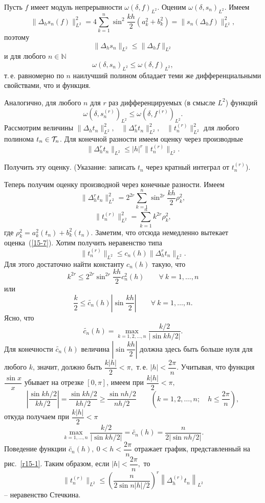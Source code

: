 Пусть $f$ имеет модуль непрерывности
{$\omega(\delta,f)_{{L^2}}.$} Оценим $\omega(\delta,s_n)_{L^2}.$
Имеем
$$
\|\Delta_h s_n{(f)}\|_{{L^2}}^2=4\sum\limits_{k=1}^n \sin^2 \frac{kh}{2}
(a_{{k}}^2+b_k^2){=\|s_n(\Delta_h f)\|_{L^2}^2},
$$
{поэтому}
$$
\|\Delta_h s_n\|_{{L^2}}\le \|\Delta_h f\|_{{L^2}}
$$
и {для любого $n\in \mathbb{N}$}
$$
\omega(\delta,s_n)_{{L^2}}\le \omega(\delta,f)_{{L^2}},
$$
т.\,е. равномерно по $n$ наилучший полином обладает теми же
дифференциальными свойствами, что и функция.

{Аналогично, для любого $n$ для $r$ раз дифференцируемых (в смысле $L^2$) функций}
$$
\omega(\delta,s_n^{(r)})_{L^2}\le \omega(\delta,f^{(r)})_{L^2}.
$$
Рассмотрим {величины} $\|\Delta_h t_n\|_{{L^2}}^2,$~ $\|\Delta_h^{r}
t_n\|_{{L^2}}^2,$~ $\|t_n^{(r)}\|_{{L^2}}^2$ {для любого
полинома $t_n\in {\cal T}_n$}. Для конечной разности имеем оценку через производные
\begin{equation}\label{15-7}
\|\Delta_h^{r} t_n\|_{{L^2}}\le |h|^r \|t_n^{(r)}\|_{{L^2}}.
\end{equation}

\begin{ex}
Получить эту оценку. (Указание: записать {$t_n$} через кратный интеграл {от $t_n^{(r)}$}).
\end{ex}

Теперь получим оценку производной через конечные
разности. Имеем
$$
\|\Delta_h^{r} t_n\|_{{L^2}}^2 = 2^{2r}\sum\limits_{k=1}^n
\sin^{2r}\frac{kh}{2}\rho_k^2,
$$
$$
\|t_n^{(r)}\|_{{L^2}}^2=\sum\limits_{k=1}^n k^{2r}\rho_k^2,
$$
{где $\rho_k^2=a_k^2(t_n)+b_k^2(t_n)$.} Заметим, что отсюда
немедленно вытекает оценка~(\ref{15-7}).
Хотим получить неравенство типа
$$
\|t_n^{(r)}\|_{L^2}\le c_n(h) \|\Delta_h^{r} t_n\|_{L^2}.
$$
Для этого достаточно найти константу $c_n(h)$ такую, что
$$
k^{2r}\le 2^{2r}\sin^{2r} \frac{kh}{2} c_n^2(h)\qquad \forall\ k=1,\ldots,n
$$
или
$$
\frac{k}{2}\le \widetilde{c_n}(h)\left| \sin\frac{kh}{2}\right|\qquad \forall\ k=1,\ldots,n.
$$
Ясно, что
$$
 \widetilde{c_n}(h)=\max_{k=1,2,\ldots,n}\frac{k/2}{|\sin kh/2|}.
$$
Для конечности $ \widetilde{c_n}(h)$ величина $\left|\sin \dfrac{kh}{2}\right|$ должна здесь
быть больше нуля для любого $k$, значит, должно быть $\dfrac{k|h|}{2}<\pi,$ т.\,е. $|h|< \dfrac{2\pi}{n}.$
{Учитывая, что функция $\dfrac{\sin x}{x}$ убывает на отрезке $[0,\pi]$,
имеем} при $\dfrac{k|h|}{2}<\pi,$
$$
\left| \frac{\sin kh/2}{kh/2}\right|={\frac{\sin kh/2}{kh/2}\ge\frac{\sin nh/2}{nh/2}\qquad
\left(k=1,2,\ldots,n;\quad h\le \frac{2\pi}{n}\right),}
$$
откуда получаем при $\dfrac{k|h|}{2}<\pi$
$$
\max_{k=1,\ldots,n}\frac{k/2}{|\sin kh/2|}=\widetilde{c_n}(h)=\frac{{n}}{2|\sin
{nh}/{2}|}.
$$
Поведение функции $\widetilde{c_n}(h),\
0<h<\dfrac{2\pi}{n}$ отражает график, представленный на
рис.~\ref{r15-1}.
Таким образом, если $|h|<\dfrac{2\pi}{n},$ то
$$
\|t_n^{(r)}\|_{{L^2}}\le \left( \frac{n}{2\sin {n|h|}/{2}}\right)^r
\left\| \Delta_h^{(r)}t_n\right\|_{{L^2}}
$$
-- неравенство Стечкина.

